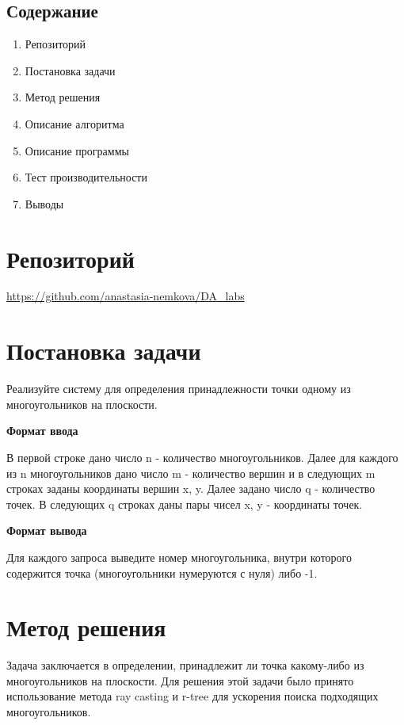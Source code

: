 \documentclass[12pt]{article}
\begin{document}
\begin{center}
\section*{Содержание}   
\end{center}
\vspace{5ex}
\begin{enumerate}
  \item Репозиторий
  \item Постановка задачи
  \item Метод решения
  \item Описание алгоритма
  \item Описание программы
  \item Тест производительности
  \item Выводы
\end{enumerate}
\newpage


\section*{Репозиторий}   
\vspace{2ex}
\url{https://github.com/anastasia-nemkova/DA_labs}

\section*{Постановка задачи}

Реализуйте систему для определения принадлежности точки одному из многоугольников на плоскости. 

\textbf{Формат ввода}

В первой строке дано число n - количество многоугольников. Далее для каждого из n многоугольников дано число m - количество вершин и в следующих m строках заданы координаты вершин x, y. Далее задано число q - количество точек. В следующих q строках даны пары чисел x, y - координаты точек. 

\textbf{Формат вывода}

Для каждого запроса выведите номер многоугольника, внутри которого содержится точка (многоугольники нумеруются с нуля) либо -1.

\section*{Метод решения}

Задача заключается в определении, принадлежит ли точка какому-либо из многоугольников на плоскости. Для решения этой задачи было принято использование метода ray casting и r-tree для ускорения поиска подходящих многоугольников.
\end{document}
